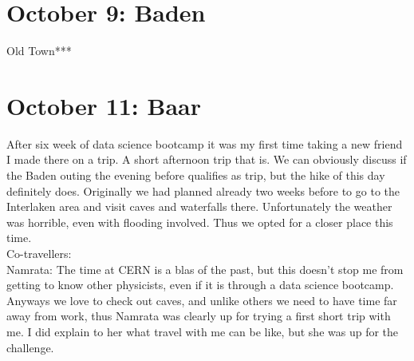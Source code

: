 \section{October 9: Baden}
\label{2020:Baden}

Old Town***

\section{October 11: Baar}
\label{2020Baar}

After six week of data science bootcamp it was my first time taking a new friend I made there on a trip. A short afternoon trip that is. We can obviously discuss if the Baden outing the evening before qualifies as trip, but the hike of this day definitely does. Originally we had planned already two weeks before to go to the Interlaken area and visit caves and waterfalls there. Unfortunately the weather was horrible, even with flooding involved. Thus we opted for a closer place this time.\\

Co-travellers:\\
Namrata: The time at CERN is a blas of the past, but this doesn't stop me from getting to know other physicists, even if it is through a data science bootcamp. Anyways we love to check out caves, and unlike others we need to have time far away from work, thus Namrata was clearly up for trying a first short trip with me. I did explain to her what travel with me can be like, but she was up for the challenge.\\

